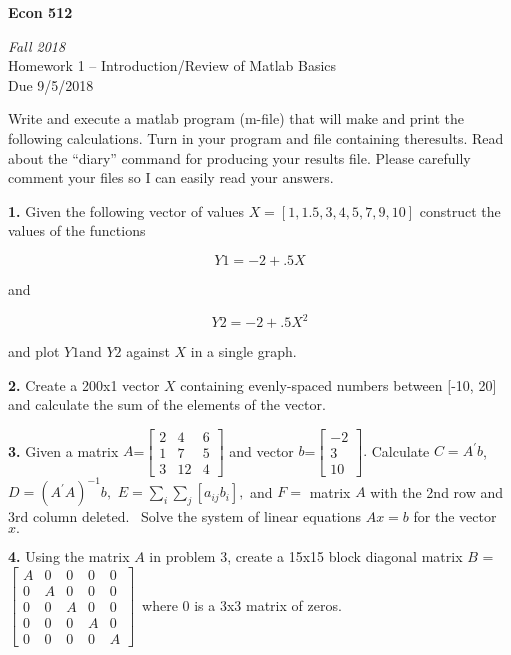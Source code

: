 \documentclass[10pt]{article}
\begin{document}
\begin{center}
\textbf{Econ 512}

\emph{Fall 2018}\\[1em]

Homework 1 -- Introduction/Review of Matlab Basics\\
Due 9/5/2018\\[3em]
\end{center}

\noindent
Write and execute a matlab program (m-file) that will make and print the following calculations. Turn in your program and file containing theresults. Read about the ``diary'' command for producing your results file. Please carefully comment your files so I can easily read your answers.

\bigskip 

\noindent
\textbf{1.} Given the following vector of values $X=[1,1.5,3,4,5,7,9,10]$
construct the values of the functions  

$$Y1=-2+.5X$$ 

and 

$$Y2=-2+.5X^{2}$$ 

and plot $Y1$and $Y2$ against $X$ in a single graph. 

\bigskip 

\noindent
\textbf{2.} Create a 200x1 vector $X$ containing evenly-spaced numbers between [-10, 20] and calculate the sum of the elements of the vector. 

\bigskip 

\noindent
\textbf{3.} Given a matrix $A$=$%
\begin{bmatrix}
2 & 4 & 6 \\ 
1 & 7 & 5 \\ 
3 & 12 & 4%
\end{bmatrix}%
$ and vector $b$=$%
\begin{bmatrix}
-2 \\ 
3 \\ 
10%
\end{bmatrix}%
.$  Calculate $C=A^{\prime }b$, \ $D=(A^{\prime }A)^{-1}b,$  $%
E=\sum_{i}\sum_{j}[a_{ij}b_{i}],$ and $F=$ matrix $A$ with the 2nd row and
3rd column deleted. \ Solve the system of linear equations $Ax=b$ for the
vector $x.$

\noindent
\textbf{4.} Using the matrix $A$ in problem 3, create a 15x15 block diagonal
matrix $B$ =  $%
\begin{bmatrix}
A & 0 & 0 & 0 & 0 \\ 
0 & A & 0 & 0 & 0 \\ 
0 & 0 & A & 0 & 0 \\ 
0 & 0 & 0 & A & 0 \\ 
0 & 0 & 0 & 0 & A%
\end{bmatrix}%
$\ where 0 is a 3x3 matrix of zeros.
\end{document}
